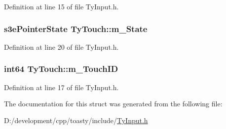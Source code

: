 Definition at line 15 of file TyInput.h.

\hypertarget{struct_ty_touch_ad37d2be38f0da16e2543f9853f68d551}{
\subsubsection[{m\_\-State}]{\setlength{\rightskip}{0pt plus 5cm}s3ePointerState {\bf TyTouch::m\_\-State}}}
\label{struct_ty_touch_ad37d2be38f0da16e2543f9853f68d551}


Definition at line 20 of file TyInput.h.

\hypertarget{struct_ty_touch_aaf8a750f8fd9558d41923eb110cae517}{
\subsubsection[{m\_\-TouchID}]{\setlength{\rightskip}{0pt plus 5cm}int64 {\bf TyTouch::m\_\-TouchID}}}
\label{struct_ty_touch_aaf8a750f8fd9558d41923eb110cae517}


Definition at line 17 of file TyInput.h.



The documentation for this struct was generated from the following file:\begin{DoxyCompactItemize}
\item 
D:/development/cpp/toasty/include/\hyperlink{_ty_input_8h}{TyInput.h}\end{DoxyCompactItemize}
